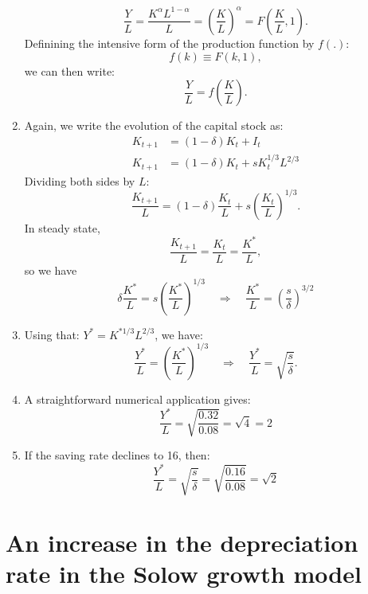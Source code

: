 \documentclass[]{book}
\theoremstyle{definition}
\theoremstyle{definition}
\theoremstyle{definition}
\theoremstyle{remark}
\begin{document}
\begin{enumerate}
  \[\frac{Y}{L}=\frac{K^\alpha L^{1-\alpha}}{L} = \left(\frac{K}{L}\right)^\alpha = F\left(\frac{K}{L}, 1\right).\]
  Definining the intensive form of the production function by \(f(.)\):
  \[f(k) \equiv F(k, 1),\] we can then write:
  \[\frac{Y}{L}=f\left(\frac{K}{L}\right).\]
\item
  Again, we write the evolution of the capital stock as:
  \[\begin{aligned}
  K_{t+1}&=(1-\delta)K_{t}+I_{t}\\
  K_{t+1}&=(1-\delta)K_{t}+sK_{t}^{1/3}L^{2/3}
  \end{aligned}\] Dividing both sides by \(L\):
  \[\frac{K_{t+1}}{L}=(1-\delta)\frac{K_{t}}{L}+s\left(\frac{K_{t}}{L}\right)^{1/3}.\]
  In steady state,
  \[\frac{K_{t+1}}{L}=\frac{K_{t}}{L}=\frac{K^{*}}{L},\] so we have
  \[\delta\frac{K^{*}}{L}=s\left(\frac{K^{*}}{L}\right)^{1/3} \quad \Rightarrow \quad \boxed{\frac{K^{*}}{L}=\left(\frac{s}{\delta}\right)^{3/2}}\]
\item
  Using that: \(Y^{*}=K^{*1/3}L^{2/3}\), we have:
  \[\frac{Y^{*}}{L}=\left(\frac{K^{*}}{L}\right)^{1/3}\quad\Rightarrow\quad\boxed{\frac{Y^{*}}{L}=\sqrt{\frac{s}{\delta}}}.\]
\item
  A straightforward numerical application gives:
  \[\frac{Y^{*}}{L}=\sqrt{\frac{0.32}{0.08}}=\sqrt{4}=2\]
\item
  If the saving rate declines to 16, then:
  \[\frac{Y^{*}}{L}=\sqrt{\frac{s}{\delta}}=\sqrt{\frac{0.16}{0.08}}=\sqrt{2}\]
\end{enumerate}

\section*{An increase in the depreciation rate in the Solow growth
model}\label{an-increase-in-the-depreciation-rate-in-the-solow-growth-model}
\end{document}
